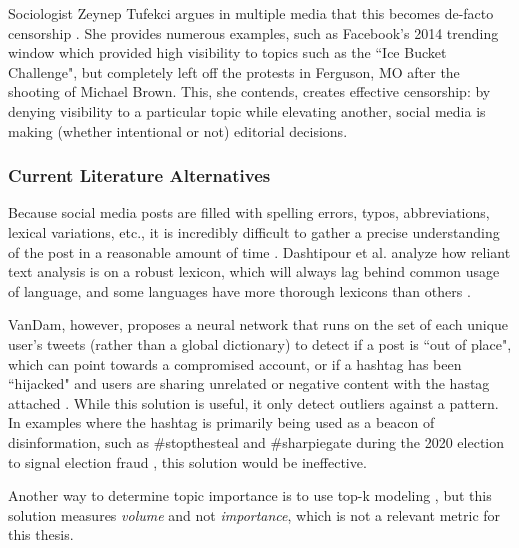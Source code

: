 \documentclass[preprint,review,12pt]{elsarticle}
\begin{document}
Sociologist Zeynep Tufekci argues in multiple media that this becomes de-facto censorship \cite{tufekci2017twitter,tufecki2018democracy,tufekci2017we,tufekci2014online}. She provides numerous examples, such as Facebook's 2014 trending window which provided high visibility to topics such as the ``Ice Bucket Challenge", but completely left off the protests in Ferguson, MO after the shooting of Michael Brown. This, she contends, creates effective censorship: by denying visibility to a particular topic while elevating another, social media is making (whether intentional or not) editorial decisions. 

\subsubsection{Current Literature Alternatives} 
Because social media posts are filled with spelling errors, typos, abbreviations, lexical variations, etc., it is incredibly difficult to gather a precise understanding of the post in a reasonable amount of time \cite{vandam2019learning,laniado2010making,schubert2014signitrend}. Dashtipour et al. analyze how reliant text analysis is on a robust lexicon, which will always lag behind common usage of language, and some languages have more thorough lexicons than others \cite{dashtipour2016multilingual}.

VanDam, however, proposes a neural network that runs on the set of each unique user's tweets (rather than a global dictionary) to detect if a post is ``out of place", which can point towards a compromised account, or if a hashtag has been ``hijacked" and users are sharing unrelated or negative content with the hastag attached  \cite{vandam2019learning, vandam2016detecting}. While this solution is useful, it only detect outliers against a pattern. In examples where the hashtag is primarily being used as a beacon of disinformation, such as \#stopthesteal and \#sharpiegate during the 2020 election to signal election fraud \cite{perez2020facebook}, this solution would be ineffective.

Another way to determine topic importance is to use top-k modeling \cite{babcock2003distributed}, but this solution measures \textit{volume} and not \textit{importance}, which is not a relevant metric for this thesis. 
\end{document}
